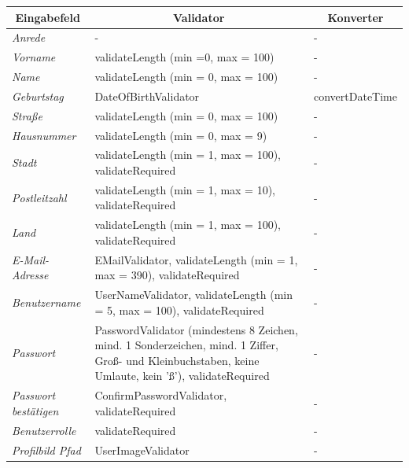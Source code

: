 \begin{itemize}
				\begin{center}
					\begin{longtable}{|p{3cm} |p{8cm} | p{5cm}|}
						
						\hline \multicolumn{1}{|c|}{\textbf{Eingabefeld}} & \multicolumn{1}{|c|}{\textbf{Validator}} & \multicolumn{1}{|c|}{\textbf{Konverter}} \\ \hline
						\endfirsthead
						\hline
						\endlastfoot
						\textit{Anrede} & - & - \\ \hline
						\textit{Vorname} & validateLength (min =0, max = 100) & - \\ \hline
						\textit{Name} & validateLength (min = 0, max = 100) & -  \\ \hline
						\textit{Geburtstag} & DateOfBirthValidator & convertDateTime  \\ \hline
						\textit{Straße} & validateLength (min = 0, max = 100) & - \\ \hline
						\textit{Hausnummer} & validateLength (min = 0, max = 9) & - \\ \hline
						\textit{Stadt} & validateLength (min = 1, max = 100), validateRequired & -  \\ \hline
						\textit{Postleitzahl} & validateLength (min = 1, max = 10), validateRequired & - \\ \hline
						\textit{Land} & validateLength (min = 1, max = 100), validateRequired & -  \\ \hline
						\textit{E-Mail-Adresse} & EMailValidator, validateLength (min = 1, max = 390), validateRequired & - \\ \hline
						\textit{Benutzername} & UserNameValidator, validateLength (min = 5, max = 100), validateRequired  & - \\ \hline
						\textit{Passwort} & PasswordValidator (mindestens 8 Zeichen, mind. 1 Sonderzeichen, mind. 1 Ziffer, Groß- und Kleinbuchstaben, keine Umlaute, kein 'ß'), validateRequired & -  \\ \hline
						\textit{Passwort bestätigen} & ConfirmPasswordValidator, validateRequired & - \\ \hline
						\textit{Benutzerrolle} & validateRequired & - \\ \hline
						\textit{Profilbild Pfad} & UserImageValidator & - \\ \hline
					\end{longtable}
				\end{center}
				

\end{itemize}
